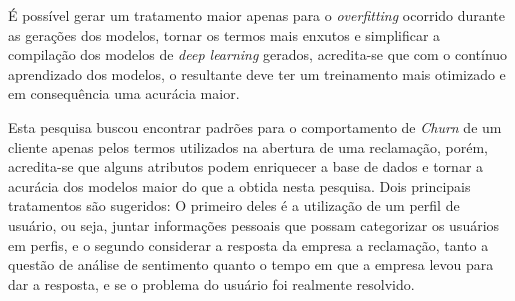 \documentclass[12pt]{article}
\begin{document}
É possível gerar um tratamento maior apenas para o \emph{overfitting} ocorrido durante as gerações dos modelos, tornar os termos mais enxutos e simplificar a compilação dos modelos de \emph{deep learning} gerados, acredita-se que com o contínuo aprendizado dos modelos, o resultante deve ter um treinamento mais otimizado e em consequência uma acurácia maior.

Esta pesquisa buscou encontrar padrões para o comportamento de \emph{Churn} de um cliente apenas pelos termos utilizados na abertura de uma reclamação, porém, acredita-se que alguns atributos podem enriquecer a base de dados e tornar a acurácia dos modelos maior do que a obtida nesta pesquisa. Dois principais tratamentos são sugeridos: O primeiro deles é a utilização de um perfil de usuário, ou seja, juntar informações pessoais que possam categorizar os usuários em perfis, e o segundo considerar a resposta da empresa a reclamação, tanto a questão de análise de sentimento quanto o tempo em que a empresa levou para dar a resposta, e se o problema do usuário foi realmente resolvido.



\end{document}

